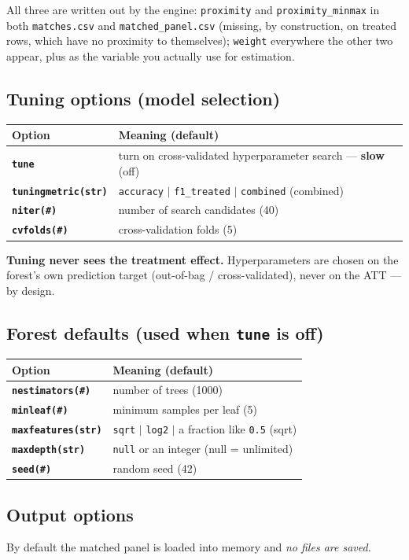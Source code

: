 \documentclass[11pt,a4paper]{article}
\newcommand{\opt}[1]{\texttt{\textbf{#1}}}
\newcommand{\code}[1]{\texttt{#1}}
\begin{document}
\medskip
\noindent All three are written out by the engine: \code{proximity} and
\code{proximity\_minmax} in both \code{matches.csv} and \code{matched\_panel.csv} (missing, by
construction, on treated rows, which have no proximity to themselves); \code{weight} everywhere
the other two appear, plus as the variable you actually use for estimation.

\subsection{Tuning options (model selection)}
\begin{tabularx}{\textwidth}{@{}lX@{}}
\toprule
Option & Meaning (default)\\
\midrule
\opt{tune}              & turn on cross-validated hyperparameter search --- \textbf{slow} (off)\\
\opt{tuningmetric(str)} & \code{accuracy} $|$ \code{f1\_treated} $|$ \code{combined} (combined)\\
\opt{niter(\#)}         & number of search candidates (40)\\
\opt{cvfolds(\#)}       & cross-validation folds (5)\\
\bottomrule
\end{tabularx}

\noindent\textbf{Tuning never sees the treatment effect.} Hyperparameters are chosen on the
forest's own prediction target (out-of-bag / cross-validated), never on the ATT --- by design.

\subsection{Forest defaults (used when \texttt{tune} is off)}
\begin{tabularx}{\textwidth}{@{}lX@{}}
\toprule
Option & Meaning (default)\\
\midrule
\opt{nestimators(\#)}   & number of trees (1000)\\
\opt{minleaf(\#)}       & minimum samples per leaf (5)\\
\opt{maxfeatures(str)}  & \code{sqrt} $|$ \code{log2} $|$ a fraction like \code{0.5} (sqrt)\\
\opt{maxdepth(str)}     & \code{null} or an integer (null = unlimited)\\
\opt{seed(\#)}          & random seed (42)\\
\bottomrule
\end{tabularx}

\subsection{Output options}
By default the matched panel is loaded into memory and \emph{no files are saved}.
\end{document}
